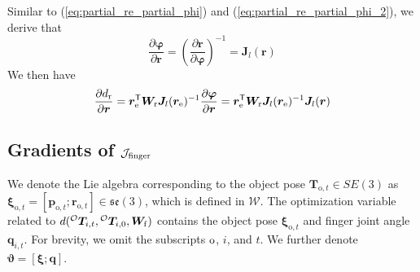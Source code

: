 {Similar to (\ref{eq:partial_re_partial_phi}) and (\ref{eq:partial_re_partial_phi_2}), we derive that 
\begin{equation} \label{eq:partial_r_partial_phi}
    \frac{\partial \bm \varphi}{\partial \bm r}
    =
    \left( \frac{\partial \bm r}{\partial \bm \varphi} \right)^{-1}
    = \bm J_l(\bm r)
\end{equation}
We then have
\begin{equation}
    \frac{\partial d_{\rm r}}{\partial \bm r} 
    = \bm r_{\rm e}^{\mathsf{T}} \bm W_{\rm r} \bm J_l(\bm r_{\rm e})^{-1}
    \frac{\partial \bm \varphi}{\partial \bm r} 
    = \bm r_{\rm e}^{\mathsf{T}} \bm W_{\rm r} \bm J_l(\bm r_{\rm e})^{-1}
    \bm J_l(\bm r)
\end{equation}

\subsection{Gradients of $\mathcal{J}_{\rm finger}$}

We denote the Lie algebra corresponding to the object pose $\bm T_{\text{o}, t} \in SE(3)$ as $\bm \xi_{\text{o}, t} = [\bm p_{\text{o}, t}; \bm r_{\text{o}, t}] \in \mathfrak{se}(3)$, which is defined in $\mathcal{W}$. 
The optimization variable related to $d({^{\mathcal{O}} \bm T_{i, t}}, {^{\mathcal{O}} \bm T_{i, 0}}, \bm W_{\rm f})$ contains the object pose $\bm \xi_{\text{o}, t}$ and finger joint angle $\bm q_{i, t}$.
For brevity, we omit the subscripts $\rm o$, $i$, and $t$.
We further denote $\bm \vartheta = [\bm \xi; \bm q]$.

}
